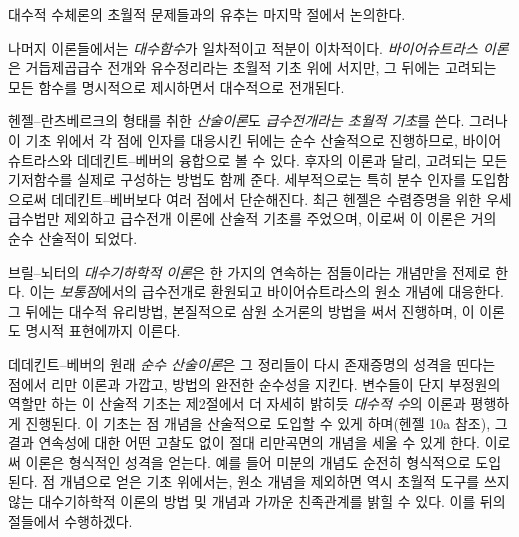 대수적 수체론의 초월적 문제들과의 유추는 마지막 절에서 논의한다.

나머지 이론들에서는 \emph{대수함수}가 일차적이고 적분이 이차적이다. \emph{바이어슈트라스 이론}은 거듭제곱급수 전개와 유수정리라는 초월적 기초 위에 서지만, 그 뒤에는 고려되는 모든 함수를 명시적으로 제시하면서 대수적으로 전개된다.

헨젤--란츠베르크의 형태를 취한 \emph{산술이론}도 \emph{급수전개라는 초월적 기초}를 쓴다. 그러나 이 기초 위에서 각 점에 인자를 대응시킨 뒤에는 순수 산술적으로 진행하므로, 바이어슈트라스와 데데킨트--베버의 융합으로 볼 수 있다. 후자의 이론과 달리, 고려되는 모든 기저함수를 실제로 구성하는 방법도 함께 준다. 세부적으로는 특히 \glqq{}분수\grqq{} 인자를 도입함으로써 데데킨트--베버보다 여러 점에서 단순해진다. 최근 헨젤은 수렴증명을 위한 우세급수법만 제외하고 급수전개 이론에 산술적 기초를 주었으며, 이로써 이 이론은 거의 순수 산술적이 되었다.

브릴--뇌터의 \emph{대수기하학적 이론}은 한 가지의 \glqq{}연속하는 점들\grqq{}이라는 개념만을 전제로 한다. 이는 \emph{보통점}에서의 급수전개로 환원되고 바이어슈트라스의 원소 개념에 대응한다. 그 뒤에는 대수적 유리방법, 본질적으로 삼원 소거론의 방법을 써서 진행하며, 이 이론도 명시적 표현에까지 이른다.

데데킨트--베버의 원래 \emph{순수 산술이론}은 그 정리들이 다시 존재증명의 성격을 띤다는 점에서 리만 이론과 가깝고, 방법의 완전한 순수성을 지킨다. 변수들이 단지 부정원의 역할만 하는 이 산술적 기초는 제2절에서 더 자세히 밝히듯 \emph{대수적 수}의 이론과 평행하게 진행된다. 이 기초는 점 개념을 산술적으로 도입할 수 있게 하며(헨젤 10a 참조), 그 결과 연속성에 대한 어떤 고찰도 없이 절대 리만곡면의 개념을 세울 수 있게 한다. 이로써 이론은 형식적인 성격을 얻는다. 예를 들어 미분의 개념도 순전히 형식적으로 도입된다. 점 개념으로 얻은 기초 위에서는, 원소 개념을 제외하면 역시 초월적 도구를 쓰지 않는 대수기하학적 이론의 방법 및 개념과 가까운 친족관계를 밝힐 수 있다. 이를 뒤의 절들에서 수행하겠다.

